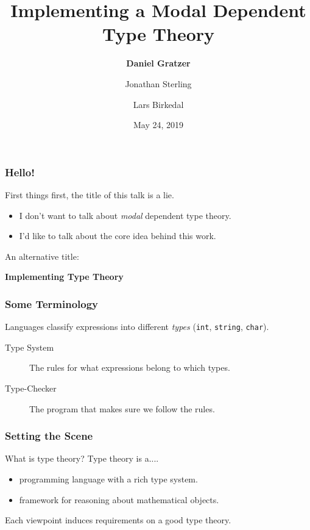 \documentclass[usenames,dvipsnames,aspectratio=169,12pt]{beamer}
\title{Implementing a Modal Dependent Type Theory}
\author{\textbf{Daniel Gratzer}\inst{1} \and Jonathan Sterling\inst{2} \and Lars Birkedal\inst{1}}
\institute{\inst{1} This University \smiley{} \\ \inst{2} Not This University \frownie{}}
\date{May 24, 2019}
\begin{document}
\begin{frame}[noframenumbering]
  \titlepage
\end{frame}

\begin{frame}
  \frametitle{Hello!}
  First things first, the title of this talk is a lie.
  \pause

  \begin{itemize}
  \item I don't want to talk about \emph{modal} dependent type theory.
  \item I'd like to talk about the core idea behind this work.
  \end{itemize}
  \pause
  \bigskip

  An alternative title:
  \begin{center}
    \Large\bf
    Implementing Type Theory
  \end{center}

\end{frame}

\begin{frame}
  \frametitle{Some Terminology}
  Languages classify expressions into different \emph{types}
  (\texttt{\textcolor{CobaltBlue}{int}},
  \texttt{\textcolor{CobaltBlue}{string}},
  \texttt{\textcolor{CobaltBlue}{char}}).
  \pause

  \begin{description}
  \item[Type System] The rules for what expressions belong to which types.
  \item[Type-Checker] The program that makes sure we follow the rules.
  \end{description}

\end{frame}

\begin{frame}
  \frametitle{Setting the Scene}

  What is type theory? Type theory is a....
  \begin{itemize}
  \item programming language with a rich type system.
  \item framework for reasoning about mathematical objects.

  \end{itemize}
  \pause
  \bigskip


  Each viewpoint induces requirements on a good type theory.
\end{frame}
\end{document}
